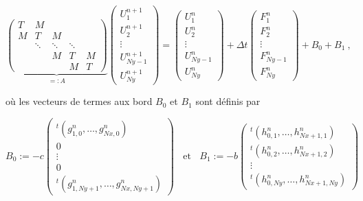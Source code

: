 \documentclass[11pt]{article}
\def \disp {\displaystyle}
\begin{document}
$$\underbrace{\begin{pmatrix}
		T & M & ~ & ~ & ~ \\
		M & T & M & ~ & ~ \\
		~ & \ddots & \ddots & \ddots &  ~ \\
		~ & ~ & M & T & M \\
		~ & ~ & ~ & M & T
	\end{pmatrix}}_{\disp =: A} \begin{pmatrix}
		U^{n+1}_1 \\
		U^{n+1}_2 \\
		\vdots \\
		U^{n+1}_{Ny-1} \\
		U^{n+1}_{Ny}
	\end{pmatrix} = \begin{pmatrix}
		U^n_1 \\
		U^n_2 \\
		\vdots \\
		U^n_{Ny-1} \\
		U^n_{Ny}
	\end{pmatrix} + \Delta t \begin{pmatrix}
		F^n_1 \\
		F^n_2 \\
		\vdots \\
		F^n_{Ny-1} \\
		F^n_{Ny}
	\end{pmatrix} + B_0 + B_1~,$$

\vspace{5 mm}

\noindent
où les vecteurs de termes aux bord $B_0$ et $B_1$ sont définis par

$$B_0 := -c \begin{pmatrix}
	^t (g^n_{1,0}, \ldots, g^n_{Nx,0}) \\
	0 \\
	\vdots \\
	0 \\
	^t (g^n_{1,Ny+1}, \ldots, g^n_{Nx,Ny+1})
\end{pmatrix}~~~~\text{et}~~~~B_1 := -b \begin{pmatrix}
	^t (h^n_{0,1}, \ldots, h^n_{Nx+1,1}) \\
	^t (h^n_{0,2}, \ldots, h^n_{Nx+1,2}) \\
	\vdots \\
	^t (h^n_{0,Ny}, \ldots, h^n_{Nx+1,Ny})
\end{pmatrix}$$

\vspace{5 mm}
\end{document}
